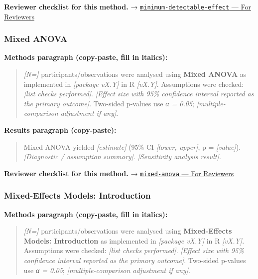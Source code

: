 \documentclass[
]{article}
\begin{document}
\textbf{Reviewer checklist for this method.} →
\href{../chapters/05-power/minimum-detectable-effect.Rmd\#for-reviewers}{\texttt{minimum-detectable-effect}
--- For Reviewers}

\subsubsection{Mixed ANOVA}\label{mixed-anova}

\textbf{Methods paragraph (copy-paste, fill in italics):}

\begin{quote}
\emph{{[}N={]}} participants/observations were analysed using
\textbf{Mixed ANOVA} as implemented in \emph{{[}package vX.Y{]}} in R
\emph{{[}vX.Y{]}}. Assumptions were checked: \emph{{[}list checks
performed{]}}. \emph{{[}Effect size with 95\% confidence interval
reported as the primary outcome{]}}. Two-sided p-values use \emph{α =
0.05}; \emph{{[}multiple-comparison adjustment if any{]}}.
\end{quote}

\textbf{Results paragraph (copy-paste):}

\begin{quote}
Mixed ANOVA yielded \emph{{[}estimate{]}} (95\% CI \emph{{[}lower,
upper{]}}, p = \emph{{[}value{]}}). \emph{{[}Diagnostic / assumption
summary{]}}. \emph{{[}Sensitivity analysis result{]}}.
\end{quote}

\textbf{Reviewer checklist for this method.} →
\href{../chapters/04-inferential/mixed-anova.Rmd\#for-reviewers}{\texttt{mixed-anova}
--- For Reviewers}

\subsubsection{Mixed-Effects Models:
Introduction}\label{mixed-effects-models-introduction}

\textbf{Methods paragraph (copy-paste, fill in italics):}

\begin{quote}
\emph{{[}N={]}} participants/observations were analysed using
\textbf{Mixed-Effects Models: Introduction} as implemented in
\emph{{[}package vX.Y{]}} in R \emph{{[}vX.Y{]}}. Assumptions were
checked: \emph{{[}list checks performed{]}}. \emph{{[}Effect size with
95\% confidence interval reported as the primary outcome{]}}. Two-sided
p-values use \emph{α = 0.05}; \emph{{[}multiple-comparison adjustment if
any{]}}.
\end{quote}
\end{document}
